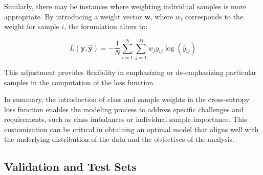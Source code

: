 Similarly, there may be instances where weighting individual samples is more appropriate. By introducing a weight vector
\(\mathbf{w}\), where \( w_i \) corresponds to the weight for sample \( i \), the formulation alters to:

\begin{equation}
    L(\mathbf{y}, \mathbf{\hat{y}}) = -\frac{1}{N}\sum_{i=1}^{N}\sum_{j=1}^{M} w_j y_{ij} \log(\hat{y}_{ij})
\end{equation}

This adjustment provides flexibility in emphasizing or de-emphasizing particular samples in the computation of the loss
function.

In summary, the introduction of class and sample weights in the cross-entropy loss function enables the modeling process
to address specific challenges and requirements, such as class imbalances or individual sample importance. This
customization can be critical in obtaining an optimal model that aligns well with the underlying distribution of the
data and the objectives of the analysis.

\subsection{Validation and Test Sets}


